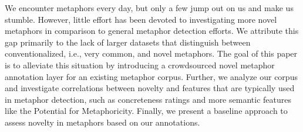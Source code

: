 We encounter metaphors every day, but only a few jump out on us and make us stumble. However, little effort has been devoted to investigating more novel metaphors in comparison to general metaphor detection efforts. We attribute this gap primarily to the lack of larger datasets that distinguish between conventionalized, i.e., very common, and novel metaphors. The goal of this paper is to alleviate this situation by introducing a crowdsourced novel metaphor annotation layer for an existing metaphor corpus. Further, we analyze our corpus and investigate correlations between novelty and features that are typically used in metaphor detection, such as concreteness ratings and more semantic features like the Potential for Metaphoricity. Finally, we present a baseline approach to assess novelty in metaphors based on our annotations.

